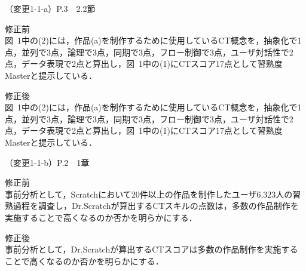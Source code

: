 \documentclass{jarticle} %
\def\subsection#1{ \vspace{1pc} {\gt #1} }
\begin{document}
\subsection{（変更1-1-a）P.3　2.2節 }
\vspace{-0.3cm}
\begin{description}
\item 修正前\\
\phantom{　}
図~1中の(2)には，作品(a)を制作するために使用しているCT概念を，抽象化で1点，並列で3点，論理で3点，同期で3点，フロー制御で3点，ユーザ対話性で2点，データ表現で2点と算出し，図~1中の(1)にCTスコア17点として習熟度Masterと提示している．
\vspace{-0.3cm}
\item 修正後\\
\phantom{　}
図~1中の(2)には，作品(a)を制作するために使用しているCT概念を，抽象化で1点，並列で3点，論理で3点，同期で3点，フロー制御で3点，ユーザ対話性で2点，データ表現で2点と算出し，図~1中の(1)にCTスコア17点として習熟度Masterと提示している．\textcolor{red}{}
\end{description}    

\subsection{（変更1-1-b）P.2　1章 }
\vspace{-0.3cm}
\begin{description}
\item 修正前\\
\phantom{　}
事前分析として，Scratchにおいて20件以上の作品を制作したユーザ6,323人の習熟過程を調査し，Dr.Scratchが算出するCTスキルの点数は，多数の作品制作を実施することで高くなるのか否かを明らかにする．
\vspace{-0.3cm}
\item 修正後\\
\phantom{　}
事前分析として，\textcolor{red}{}Dr.Scratchが算出するCTスコアは多数の作品制作を実施することで高くなるのか否かを明らかにする．
\end{description}      
      
\end{document}

